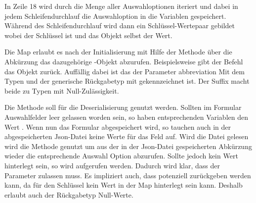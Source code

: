 In Zeile 18 wird durch die  Menge aller Auswahloptionen  iteriert und dabei in jedem Schleifendurchlauf die Auswahloption in die Variablen  gespeichert.
Während des Schleifendurchlauf wird dann ein Schlüssel-Wertepaar gebildet wobei  der Schlüssel ist und das Objekt  selbst der Wert.

Die Map  erlaubt es nach der Initialisierung mit Hilfe der Methode   über die Abkürzung das dazugehörige -Objekt abzurufen.
Beispielsweise gibt der Befehl  das Objekt  zurück. Auffällig dabei ist das der Parameter abbreviation Mit dem Typen  und der generische Rückgabetyp mit  gekennzeichnet ist. Der Suffix  macht beide zu Typen mit Null-Zulässigkeit.



Die Methode  soll für die Deserialisierung genutzt werden.
 Sollten im Formular Auswahlfelder leer gelassen worden sein, so haben  entsprechenden Variablen den Wert .
Wenn nun das Formular abgespeichert wird, so tauchen auch in der abgespeicherten Json-Datei keine Werte für das Feld auf.
Wird die Datei gelesen wird die Methode  genutzt um aus der in der Json-Datei gespeicherten Abkürzung wieder die entsprechende Auswahl Option abzurufen.
Sollte jedoch kein Wert hinterlegt sein, so wird  aufgerufen werden. Dadurch wird klar, dass der Parameter  zulassen muss. Es impliziert auch, dass potenziell  zurückgeben werden kann, da für den Schlüssel  kein Wert in der Map hinterlegt sein kann. Deshalb  erlaubt auch der Rückgabetyp  Null-Werte.
